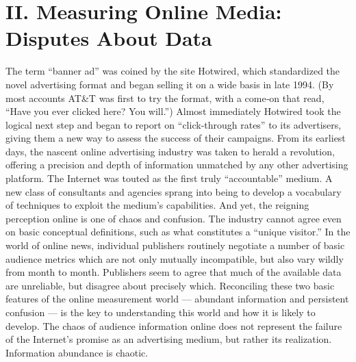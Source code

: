 \chapter{II. Measuring Online Media: Disputes About Data}
The term ``banner ad'' was coined by the site Hotwired, which
standardized the novel advertising format and began selling it on a wide
basis in late 1994. (By most accounts AT&T was first to try the format,
with a come‐on that read, ``Have you ever clicked here? You will.'')
Almost immediately Hotwired took the logical next step and began to
report on ``click‐through rates'' to its advertisers, giving them a new way
to assess the success of their campaigns.
From its earliest days, the nascent online advertising industry was taken
to herald a revolution, offering a precision and depth of information
unmatched by any other advertising platform. The Internet was touted as
the first truly ``accountable'' medium. A new class of consultants and
agencies sprang into being to develop a vocabulary of techniques to
exploit the medium’s capabilities.
And yet, the reigning perception online is one of chaos and confusion. The
industry cannot agree even on basic conceptual definitions, such as what
constitutes a ``unique visitor.'' In the world of online news, individual
publishers routinely negotiate a number of basic audience metrics which
are not only mutually incompatible, but also vary wildly from month to
month. Publishers seem to agree that much of the available data are
unreliable, but disagree about precisely which.
Reconciling these two basic features of the online measurement world —
abundant information and persistent confusion — is the key to
understanding this world and how it is likely to develop. The chaos of
audience information online does not represent the failure of the Internet’s
promise as an advertising medium, but rather its realization. Information
abundance is chaotic.
